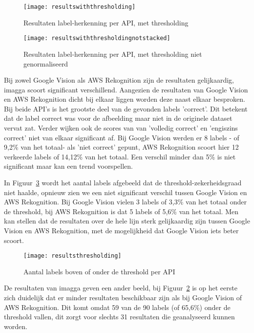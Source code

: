 \begin{figure}
    \centering    
    \texttt{[image: resultswiththresholding]}
    \caption{Resultaten label-herkenning per API, met thresholding}
    \label{fig:resultswiththresholding}
\end{figure}

\begin{figure}
    \centering    
    \texttt{[image: resultswiththresholdingnotstacked]}
    \caption{Resultaten label-herkenning per API, met thresholding niet genormaliseerd}
    \label{fig:resultswiththresholdingnotstacked}
\end{figure}

Bij zowel Google Vision als AWS Rekognition zijn de resultaten gelijkaardig, imagga scoort significant verschillend. Aangezien de resultaten van Google Vision en AWS Rekognition dicht bij elkaar liggen worden deze naast elkaar besproken. Bij beide API's is het grootste deel van de gevonden labels 'correct'. Dit betekent dat de label correct was voor de afbeelding maar niet in de originele dataset vervat zat. Verder wijken ook de scores van van 'volledig correct' en 'engiszins correct' niet van elkaar significant af. Bij Google Vision werden er 8 labels - of 9,2\% van het totaal- als 'niet correct' gepunt, AWS Rekognition scoort hier 12 verkeerde labels of 14,12\% van het totaal. Een verschil minder dan 5\% is niet significant maar kan een trend voorspellen.

In Figuur~\ref{fig:resultsthresholding} wordt het aantal labels afgebeeld dat de threshold-zekerheidsgraad niet haalde, opnieuw zien we een niet significant verschil tussen Google Vision en AWS Rekognition. Bij Google Vision vielen 3 labels of 3,3\% van het totaal onder de threshold, bij AWS Rekognition is dat 5 labels of 5,6\% van het totaal. Men kan stellen dat de resultaten over de hele lijn sterk gelijkaardig zijn tussen Google Vision en AWS Rekognition, met de mogelijkheid dat Google Vision iets beter scoort.

\begin{figure}
    \centering    
    \texttt{[image: resultsthresholding]}
    \caption{Aantal labels boven of onder de threshold per API}
    \label{fig:resultsthresholding}
\end{figure}

De resultaten van imagga geven een ander beeld, bij Figuur~\ref{fig:resultswiththresholdingnotstacked} is op het eerste zich duidelijk dat er minder resultaten beschikbaar zijn als bij Google Vision of AWS Rekognition. Dit komt omdat 59 van de 90 labels (of 65,6\%) onder de threshold vallen, dit zorgt voor slechts 31 resultaten die geanalyseerd kunnen worden.

